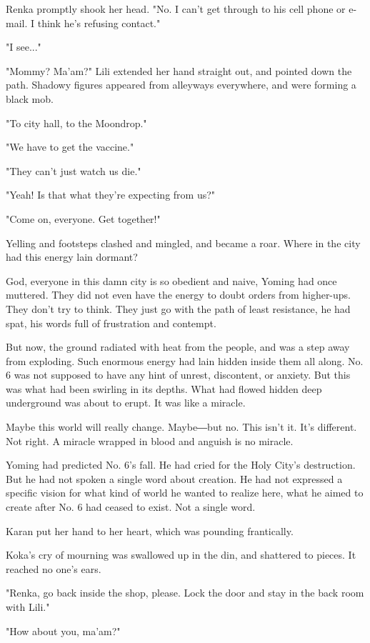 Renka promptly shook her head. "No. I can't get through to his cell
phone or e-mail. I think he's refusing contact."

"I see..."

"Mommy? Ma'am?" Lili extended her hand straight out, and pointed down
the path. Shadowy figures appeared from alleyways everywhere, and were
forming a black mob.

"To city hall, to the Moondrop."

"We have to get the vaccine."

"They can't just watch us die."

"Yeah! Is that what they're expecting from us?"

"Come on, everyone. Get together!"

Yelling and footsteps clashed and mingled, and became a roar. Where in
the city had this energy lain dormant?

God, everyone in this damn city is so obedient and naive, Yoming had
once muttered. They did not even have the energy to doubt orders from
higher-ups. They don't try to think. They just go with the path of least
resistance, he had spat, his words full of frustration and contempt.

But now, the ground radiated with heat from the people, and was a step
away from exploding. Such enormous energy had lain hidden inside them
all along. No. 6 was not supposed to have any hint of unrest,
discontent, or anxiety. But this was what had been swirling in its
depths. What had flowed hidden deep underground was about to erupt. It
was like a miracle.

Maybe this world will really change. Maybe―but no. This isn't it. It's
different. Not right. A miracle wrapped in blood and anguish is no
miracle.

Yoming had predicted No. 6's fall. He had cried for the Holy City's
destruction. But he had not spoken a single word about creation. He had
not expressed a specific vision for what kind of world he wanted to
realize here, what he aimed to create after No. 6 had ceased to exist.
Not a single word.

Karan put her hand to her heart, which was pounding frantically.

Koka's cry of mourning was swallowed up in the din, and shattered to
pieces. It reached no one's ears.

"Renka, go back inside the shop, please. Lock the door and stay in the
back room with Lili."

"How about you, ma'am?"

